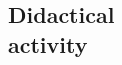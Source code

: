 \documentclass[margin,line]{resume}
\begin{document}
\begin{resume}
%


\newpage

\section{\mysidestyle Didactical\\activity}

\begin{list2}


\end{list2}
\end{resume}
\end{document}
